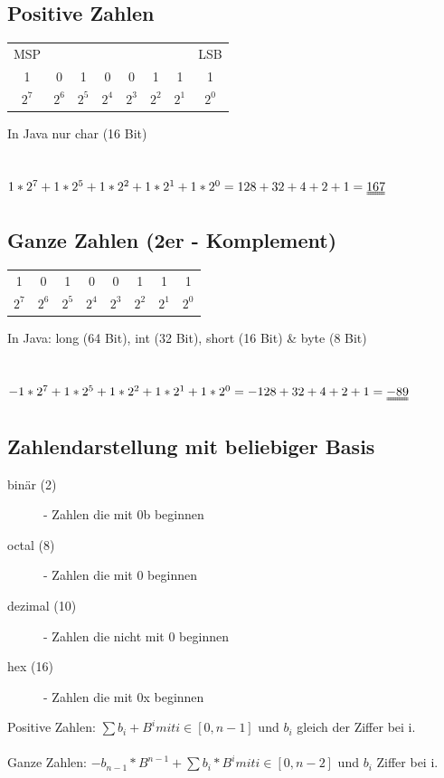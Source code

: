 \documentclass[a4paper,10pt]{article}
\begin{document}
\subsection{Positive Zahlen}
\begin{tabular}{c c c c c c c c}
	MSP & & & & & & & LSB \\
	1 & 0 & 1 & 0 & 0 & 1 & 1 & 1 \\
	$2^7$ & $2^6$ & $2^5$ & $2^4$ & $2^3$ & $2^2$ & $2^1$ & $2^0$
\end{tabular}
In Java nur char (16 Bit) \\ \\ \\
$1*2^7+1*2^5+1*2^2+1*2^1+1*2^0=128+32+4+2+1=\uuline{167}$

\subsection{Ganze Zahlen (2er - Komplement)}
\begin{tabular}{c c c c c c c c}
	1 & 0 & 1 & 0 & 0 & 1 & 1 & 1 \\
	$2^7$ & $2^6$ & $2^5$ & $2^4$ & $2^3$ & $2^2$ & $2^1$ & $2^0$
\end{tabular} 
In Java: long (64 Bit), int (32 Bit), short (16 Bit) \& byte (8 Bit) \\ \\ \\
$-1*2^7+1*2^5+1*2^2+1*2^1+1*2^0=-128+32+4+2+1=\uuline{-89}$

\subsection{Zahlendarstellung mit beliebiger Basis}
\begin{description}
	\item[binär (2)] - Zahlen die mit 0b beginnen
	\item[octal (8)] - Zahlen die mit 0 beginnen
	\item[dezimal (10)] - Zahlen die nicht mit 0 beginnen
	\item[hex (16)] - Zahlen die mit 0x beginnen
\end{description}
Positive Zahlen: $\sum b_i+B^i mit i \in [0,n-1]$ und $b_i$ gleich der Ziffer bei i. \\ \\
Ganze Zahlen: $-b_{n-1}*B^{n-1}+\sum b_i*B^i mit i \in [0,n-2]$ und  $b_i$ Ziffer bei i.
\end{document}
